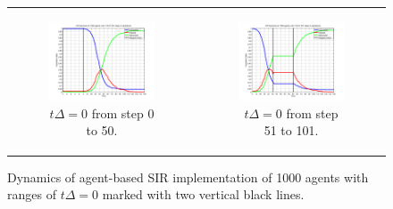 \begin{figure}
\begin{center}
	\begin{tabular}{c c}
		\begin{subfigure}[b]{0.5\textwidth}
			\centering
			\includegraphics[width=.8\textwidth, angle=0]{./../shared/fig/dtzero/SIR_ABS_zeroDt_start.png}
			\caption{$t\Delta = 0$ from step 0 to 50.}
			\label{fig:sd_plot_10dt}
		\end{subfigure}
	
		& 
		
		\begin{subfigure}[b]{0.5\textwidth}
			\centering
			\includegraphics[width=.8\textwidth, angle=0]{./../shared/fig/dtzero/SIR_ABS_zeroDt_mid.png}
			\caption{$t\Delta = 0$ from step 51 to 101.}
			\label{fig:sd_plot_0.01dt}
		\end{subfigure}
	\end{tabular}
	
	\caption{Dynamics of agent-based SIR implementation of 1000 agents with ranges of $t\Delta = 0$ marked with two vertical black lines.}
	\label{fig:sir_abs_zero_dt}
\end{center}
\end{figure}

